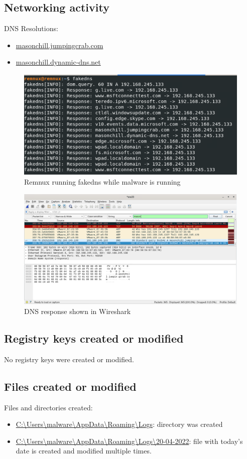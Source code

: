 \documentclass{article}
\begin{document}
    \subsection{Networking activity}
    DNS Resolutions:
    \begin{itemize}
        \item \url{masonchill.jumpingcrab.com}
        \item \url{masonchill.dynamic-dns.net}
    \end{itemize}
    \begin{figure}[H]
        \includegraphics[width=\textwidth]{fakedns.png}
        \caption{Remnux running fakedns while malware is running}
    \end{figure}
    \begin{figure}[H]
        \includegraphics[width=\textwidth]{wireshark.png}
        \caption{DNS response shown in Wireshark}
    \end{figure}
    \subsection{Registry keys created or modified}
    No registry keys were created or modified.
    \subsection{Files created or modified}
    Files and directories created:
    \begin{itemize}
        \item \url{C:\Users\malware\AppData\Roaming\Logs}: directory was created
        \item \url{C:\Users\malware\AppData\Roaming\Logs\20-04-2022}: file with today's date is created and modified multiple times.
    \end{itemize}
\end{document}
